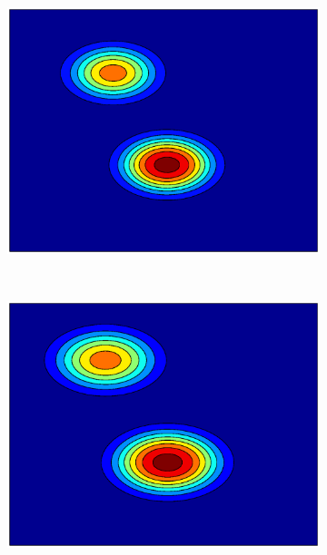 \documentclass[useAMS,usenatbib,fleqn]{mn2e}
\begin{document}
\begin{figure}
         \begin{subfigure}[b]{0.3\columnwidth}
               \includegraphics[width=\textwidth]{figures/GPGL2.eps}
        \end{subfigure}
        ~
         \begin{subfigure}[b]{0.3\columnwidth}
               \includegraphics[width=\textwidth]{figures/GPVL2.eps}
        \end{subfigure}
        ~
        \begin{subfigure}[b]{0.3\columnwidth}

\end{subfigure}
\end{figure}
\end{document}
